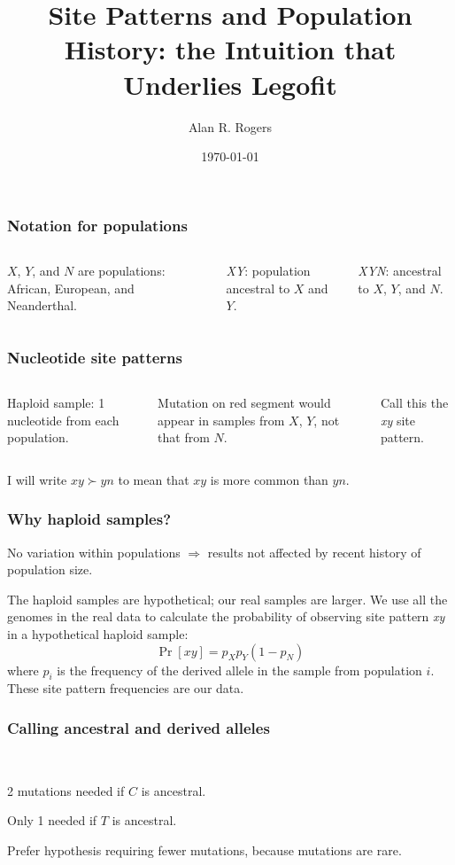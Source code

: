 \documentclass[pdftex,12pt]{beamer}
\author{Alan R. Rogers}
\date{\today}
\begin{document}
\title{Site Patterns and Population History: the Intuition that
  Underlies Legofit}
\frame{\titlepage}

\begin{frame}
  \frametitle{Notation for populations}
  \begin{columns}
    
    \raggedleft
    $X$, $Y$, and $N$ are populations: African, European, and Neanderthal.

    \bigskip
    
    \textit{XY}: population ancestral to $X$ and $Y$.

    \bigskip
    
    \textit{XYN}: ancestral to $X$, $Y$, and $N$.
    \end{columns}
\end{frame}

\begin{frame}
  \frametitle{Nucleotide site patterns}
  \begin{columns}
    
    \raggedleft
    Haploid sample: 1 nucleotide from each population.

    \bigskip
    
    Mutation on red segment would appear in samples from $X$, $Y$, not
    that from $N$.

    \bigskip
    Call this the \textit{xy} site pattern.
  \end{columns}
  \bigskip\raggedleft I will write $xy\succ yn$ to mean that $xy$ is more
  common than $yn$.
\end{frame}

\begin{frame}
  \frametitle{Why haploid samples?}
  No variation within populations $\Rightarrow$ results not affected
  by recent history of population size.

  \bigskip

  The haploid samples are hypothetical; our real samples are
  larger. We use all the genomes in the real data to calculate the
  probability of observing site pattern \emph{xy} in a hypothetical
  haploid sample:
  \[
  \Pr[xy] = p_X p_Y (1-p_N)
  \]
  where $p_i$ is the frequency of the derived allele in the sample
  from population $i$. These site pattern frequencies are our data.
\end{frame}  

\begin{frame}
  \frametitle{Calling ancestral and derived alleles}
{\centering\\}
    \bigskip
    
    2 mutations needed if $C$ is ancestral.

    \bigskip

    Only 1 needed if $T$ is ancestral.

    \bigskip

    Prefer hypothesis requiring fewer mutations, because mutations
    are rare.
\end{frame}
\end{document}
